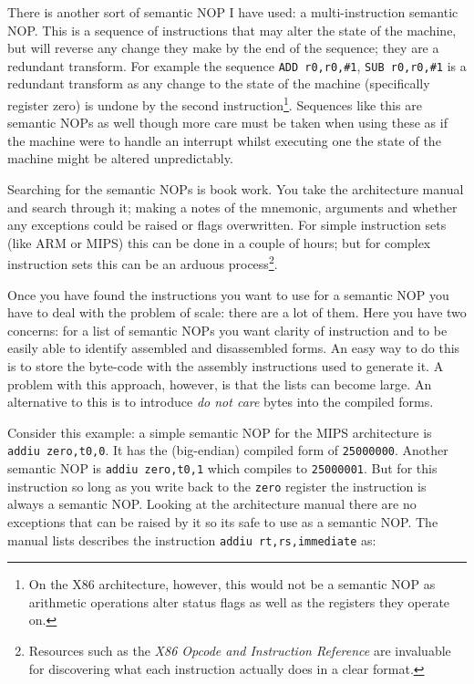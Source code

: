 \documentclass[10pt,]{book}
\begin{document}
There is another sort of semantic NOP I have used: a multi-instruction
semantic NOP. This is a sequence of instructions that may alter the
state of the machine, but will reverse any change they make by the end
of the sequence; they are a redundant transform. For example the
sequence \lstinline!ADD r0,r0,#1!, \lstinline!SUB r0,r0,#1! is a
redundant transform as any change to the state of the machine
(specifically register zero) is undone by the second
instruction\footnote{On the X86
  architecture\autocite{IntelCorporation:1997ta}, however, this would
  not be a semantic NOP as arithmetic operations alter status flags as
  well as the registers they operate on\autocite{refx86}.}. Sequences
like this are semantic NOPs as well though more care must be taken when
using these as if the machine were to handle an interrupt whilst
executing one the state of the machine might be altered unpredictably.

Searching for the semantic NOPs is book work. You take the architecture
manual and search through it; making a notes of the mnemonic, arguments
and whether any exceptions could be raised or flags overwritten. For
simple instruction sets (like ARM or MIPS) this can be done in a couple
of hours; but for complex instruction sets this can be an arduous
process\footnote{Resources such as the \emph{X86 Opcode and Instruction
  Reference} \autocite{refx86} are invaluable for discovering what each
  instruction actually does in a clear format.}.

Once you have found the instructions you want to use for a semantic NOP
you have to deal with the problem of scale: there are a lot of them.
Here you have two concerns: for a list of semantic NOPs you want clarity
of instruction and to be easily able to identify assembled and
disassembled forms. An easy way to do this is to store the byte-code
with the assembly instructions used to generate it. A problem with this
approach, however, is that the lists can become large. An alternative to
this is to introduce \emph{do not care} bytes into the compiled forms.

Consider this example: a simple semantic NOP for the MIPS architecture
is \lstinline!addiu zero,t0,0!. It has the (big-endian) compiled form of
\lstinline!25000000!. Another semantic NOP is
\lstinline!addiu zero,t0,1! which compiles to \lstinline!25000001!. But
for this instruction so long as you write back to the \lstinline!zero!
register the instruction is always a semantic NOP. Looking at the
architecture manual\autocite{MIPSTechnologiesInc:2011ta} there are no
exceptions that can be raised by it so its safe to use as a semantic
NOP. The manual lists describes the instruction
\lstinline!addiu rt,rs,immediate! as:
\end{document}
